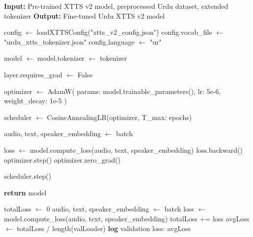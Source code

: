 \begin{algorithm}[H]
\caption{XTTS v2 Fine-tuning for Urdu}
\begin{algorithmic}[1]
\State \textbf{Input:} Pre-trained XTTS v2 model, preprocessed Urdu dataset, extended tokenizer
\State \textbf{Output:} Fine-tuned Urdu XTTS v2 model

    \State config $\gets$ loadXTTSConfig("xtts\_v2\_config.json")
    \State config.vocab\_file $\gets$ "urdu\_xtts\_tokenizer.json"
    \State config.language $\gets$ "ur"
    
    \State model $\gets$ 
    \State model.tokenizer $\gets$ tokenizer
    
    \State {}
        \State layer.requires\_grad $\gets$ False
    \EndFor
    
    \State optimizer $\gets$ AdamW(
        \State \quad params: model.trainable\_parameters(),
        \State \quad lr: 5e-6,
        \State \quad weight\_decay: 1e-5
    \State )
    
    \State scheduler $\gets$ CosineAnnealingLR(optimizer, T\_max: epochs)
    
            \State audio, text, speaker\_embedding $\gets$ batch
            
            \State loss $\gets$ model.compute\_loss(audio, text, speaker\_embedding)
            \State loss.backward()
            \State optimizer.step()
            \State optimizer.zero\_grad()
            
                \State {}
                \State {}
            \EndIf
        \EndFor
        
        \State scheduler.step()
        \State {}
    \EndFor
    
    \State \textbf{return} model
\EndProcedure

    \State totalLoss $\gets$ 0
        \State audio, text, speaker\_embedding $\gets$ batch
        \State loss $\gets$ model.compute\_loss(audio, text, speaker\_embedding)
        \State totalLoss += loss
    \EndFor
    \State avgLoss $\gets$ totalLoss / length(valLoader)
    \State \textbf{log} validation loss: avgLoss
\EndProcedure
\end{algorithmic}
\end{algorithm}

